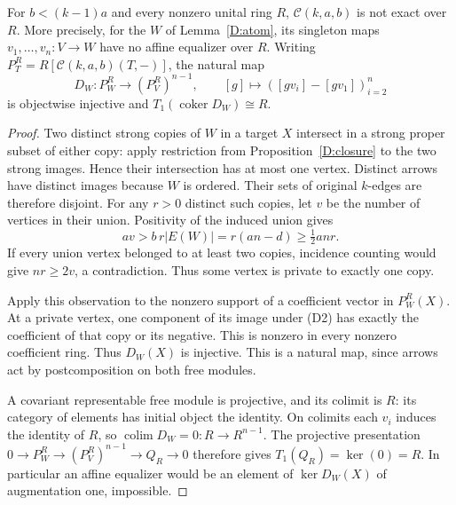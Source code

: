 \begin{theorem}
\label{D:nonexact}
For $b<(k-1)a$ and every nonzero unital ring $R$,
$\mathcal C(k,a,b)$ is not exact over $R$. More precisely, for the
$W$ of Lemma~\ref{D:atom}, its singleton maps
$v_1,\ldots,v_n:V\to W$ have no affine equalizer over $R$.
Writing $P_T^R=R[\mathcal C(k,a,b)(T,-)]$, the natural map
\[
 D_W:P_W^R\longrightarrow(P_V^R)^{n-1},\qquad
 [g]\longmapsto([gv_i]-[gv_1])_{i=2}^n
 \tag{D2}\label{eq:D-column}
\]
is objectwise injective and
$T_1(\operatorname{coker}D_W)\cong R$.
\end{theorem}
\begin{proof}
Two distinct strong copies of $W$ in a target $X$ intersect in a
strong proper subset of either copy: apply restriction from
Proposition~\ref{D:closure} to the two strong images. Hence their
intersection has at most one vertex.
Distinct arrows have distinct images because $W$ is ordered.
Their sets of original $k$-edges are therefore disjoint.
For any $r>0$ distinct such copies, let $v$ be the number of vertices
in their union. Positivity of the induced union gives
\[
 av>b\,r|E(W)|=r(an-d)\geq\tfrac12anr.
\]
If every union vertex belonged to at least two copies, incidence
counting would give $nr\geq2v$, a contradiction. Thus some vertex
is private to exactly one copy.

Apply this observation to the nonzero support of a coefficient
vector in $P_W^R(X)$. At a private vertex, one component of its
image under (D2) has exactly the coefficient of that copy or its
negative. This is nonzero in every nonzero coefficient ring.
Thus $D_W(X)$ is injective. This is a natural map, since arrows act
by postcomposition on both free modules.

A covariant representable free module is projective, and its colimit
is $R$: its category of elements has initial object the identity.
On colimits each $v_i$ induces the identity of $R$, so
$\operatorname{colim}D_W=0:R\to R^{n-1}$.
The projective presentation
$0\to P_W^R\to(P_V^R)^{n-1}\to Q_R\to0$ therefore gives
$T_1(Q_R)=\ker(0)=R$. In particular an affine equalizer would
be an element of $\ker D_W(X)$ of augmentation one, impossible.
\end{proof}

